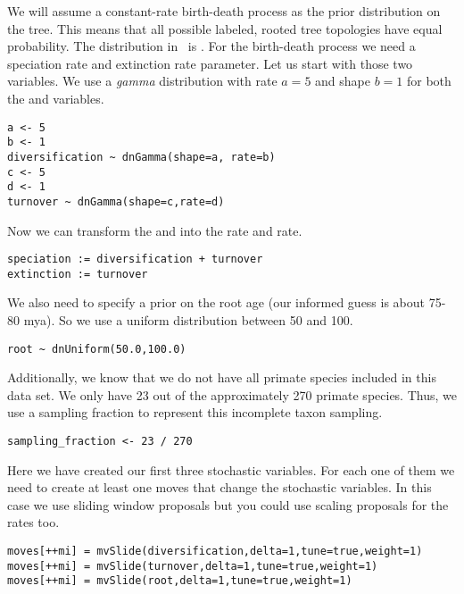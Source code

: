 We will assume a constant-rate birth-death process as the prior distribution on the tree.
This means that all possible labeled, rooted tree topologies have equal probability. 
The distribution in \RevBayes~is . 
For the birth-death process we need a speciation rate and extinction rate parameter.
Let us start with those two variables.
We use a \textit{gamma} distribution with rate $a=5$ and shape $b=1$ for both the  and  variables.
{\tt \begin{snugshade*}
\begin{lstlisting}
a <- 5
b <- 1
diversification ~ dnGamma(shape=a, rate=b)
c <- 5
d <- 1
turnover ~ dnGamma(shape=c,rate=d)
\end{lstlisting}
\end{snugshade*}}
Now we can transform the  and  into the  rate and  rate.
{\tt \begin{snugshade*}
\begin{lstlisting}
speciation := diversification + turnover
extinction := turnover
\end{lstlisting}
\end{snugshade*}}
We also need to specify a prior on the root age (our informed guess is about 75-80 mya).
So we use a uniform distribution between 50 and 100.
{\tt \begin{snugshade*}
\begin{lstlisting}
root ~ dnUniform(50.0,100.0)
\end{lstlisting}
\end{snugshade*}}
Additionally, we know that we do not have all primate species included in this data set.
We only have 23 out of the approximately 270 primate species.
Thus, we use a sampling fraction to represent this incomplete taxon sampling.
{\tt \begin{snugshade*}
\begin{lstlisting}
sampling_fraction <- 23 / 270
\end{lstlisting}
\end{snugshade*}}
Here we have created our first three stochastic variables.
For each one of them we need to create at least one moves that change the stochastic variables.
In this case we use sliding window proposals but you could use scaling proposals for the rates too.
{\tt \begin{snugshade*}
\begin{lstlisting}
moves[++mi] = mvSlide(diversification,delta=1,tune=true,weight=1)
moves[++mi] = mvSlide(turnover,delta=1,tune=true,weight=1)
moves[++mi] = mvSlide(root,delta=1,tune=true,weight=1)
\end{lstlisting}
\end{snugshade*}}

